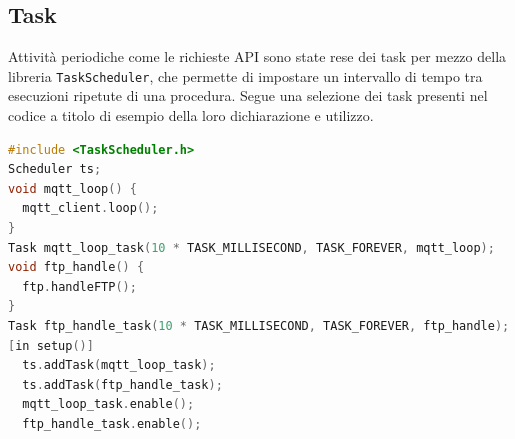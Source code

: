\documentclass[12pt,a4paper]{report}
\begin{document}
\subsection{Task}
Attività periodiche come le richieste API sono state rese dei task per mezzo della libreria \texttt{TaskScheduler}, che permette di
impostare un intervallo di tempo tra esecuzioni ripetute di una procedura.
Segue una selezione dei task presenti nel codice a titolo di esempio della loro dichiarazione e utilizzo.
\begin{lstlisting}[language=cpp]
#include <TaskScheduler.h>
Scheduler ts;
void mqtt_loop() {
  mqtt_client.loop();
}
Task mqtt_loop_task(10 * TASK_MILLISECOND, TASK_FOREVER, mqtt_loop);
void ftp_handle() {
  ftp.handleFTP();
}
Task ftp_handle_task(10 * TASK_MILLISECOND, TASK_FOREVER, ftp_handle);
[in setup()]
  ts.addTask(mqtt_loop_task);
  ts.addTask(ftp_handle_task);
  mqtt_loop_task.enable();
  ftp_handle_task.enable();

\end{lstlisting}
\end{document}
